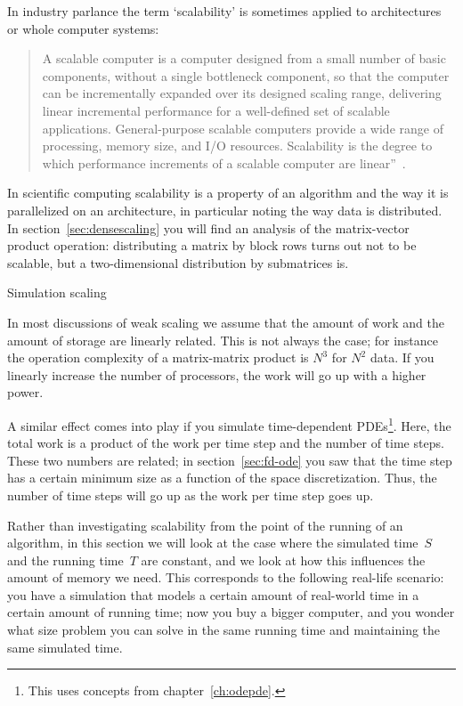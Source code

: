 In industry parlance the term `scalability' is sometimes
applied to architectures or whole computer systems:
\begin{quotation}
  A
  scalable computer is a computer designed from a small number of
  basic components, without a single bottleneck component, so that
  the computer can be incrementally expanded over its designed scaling
  range, delivering linear incremental performance for a well-defined
  set of scalable applications.  General-purpose scalable computers
  provide a wide range of processing, memory size, and I/O
  resources.  Scalability is the degree to which performance
  increments of a scalable computer are linear''~\cite{Bell:outlook}.
\end{quotation}
In scientific computing
scalability is a property of an algorithm and the way it is
parallelized on an architecture, in
particular noting the way data is distributed. In
section~\ref{sec:densescaling} you will find an analysis of the
matrix-vector product operation: distributing a matrix by block rows
turns out not to be scalable, but a two-dimensional distribution by
submatrices is.

 {Simulation scaling}

In most discussions of weak scaling
we assume that the amount of work and 
the amount of storage are linearly related. This is not always the case; for instance
the operation complexity of a matrix-matrix product is $N^3$ for $N^2$ data.
If you linearly increase the number of processors, the work will go up with a higher power.

A similar effect comes into play if you simulate time-dependent \acp{PDE}\footnote
{This uses concepts from chapter~\ref{ch:odepde}.}.
Here, the total work is a product of the work per time step and the number of 
time steps. These two numbers are related; in section~\ref{sec:fd-ode} you
saw that the time step has a certain minimum size as a function of the 
space discretization. Thus, the number of time steps will go up as the work per
time step goes up.

Rather than investigating scalability from the point of the running
of an algorithm, in this section we will look at the case where the simulated time~$S$
and the running time~$T$ are constant, and we look at how this influences the amount of
memory we need. This corresponds to the following real-life scenario: 
you have a simulation that models a certain amount of real-world time 
in a certain amount of running time; now you buy a bigger computer, and you wonder
what size problem you can solve in the same running time and maintaining
the same simulated time.

